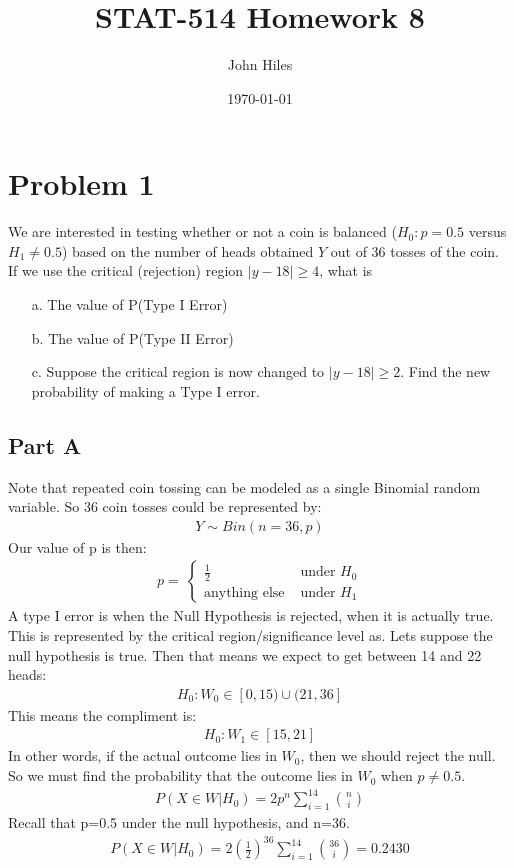 \documentclass{article}
\title{STAT-514 Homework 8}
\author{John Hiles}
\date\today
\begin{document}
\maketitle %

\section*{Problem 1}
We are interested in testing whether or not a coin is balanced ($H_0:p=0.5$ versus $H_1\neq 0.5$) based on the number of heads obtained $Y$ out of 36 tosses of the coin. If we use the
critical (rejection) region $|y - 18| \geq 4$, what is
\begin{enumerate}
\item[a.] The value of P(Type I Error)
\item[b.] The value of P(Type II Error)
\item[c.] Suppose the critical region is now changed to $|y-18| \geq 2$. Find the new probability of making a Type I error.
\end{enumerate}
\subsection*{Part A}
Note that repeated coin tossing can be modeled as a single Binomial random variable. So 36 coin tosses could be represented by:
\begin{align*}
Y \sim Bin(n=36,p)
\end{align*}
Our value of p is then:
\begin{align*}
p = \
\begin{cases} 
\frac{1}{2} & \text{ under } H_0 \\
       \text{anything else} & \text{ under } H_1
   \end{cases}
\end{align*}
A type I error is when the Null Hypothesis is rejected, when it is actually true. This is represented by the critical region/significance level as. Lets suppose the null hypothesis is true. Then that means we expect to get between 14 and 22 heads:
\begin{align*}
H_0: W_0 \in [0,15) \cup (21,36]
\end{align*}
This means the compliment is:
\begin{align*}
H_0: W_1 \in [15,21]
\end{align*}
In other words, if the actual outcome lies in $W_0$, then we should reject the null. So we must find the probability that the outcome lies in $W_0$ when $p \neq 0.5$.
\begin{align*}
P(X \in W|H_0) = 2 p^n \sum_{i=1}^{14} \binom{n}{i}
\end{align*}
Recall that p=0.5 under the null hypothesis, and n=36.
\begin{align*}
\boxed{ P(X \in W|H_0) = 2 (\frac{1}{2})^{36} \sum_{i=1}^{14} \binom{36}{i} = 0.2430 }
\end{align*}
\end{document}
